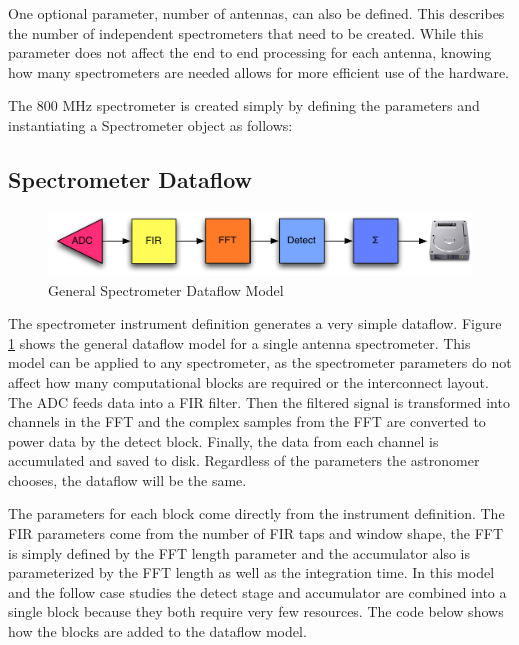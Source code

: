 One optional parameter, number of antennas, can also be defined. 
This describes the number of independent spectrometers that need to be created.
While this parameter does not affect the end to end processing for each antenna, knowing how many spectrometers are needed allows for more efficient use of the hardware.

The 800 MHz spectrometer is created simply by defining the parameters and instantiating a Spectrometer object as follows:



\subsection{Spectrometer Dataflow}

\begin{figure}[ht!]
  \centering
    \includegraphics[width=1\textwidth]{Images/C4/spectrometer_dataflow.pdf}
  \caption{General Spectrometer Dataflow Model}
  \label{fig: C4/spectrometer_dataflow.pdf}
\end{figure}

The spectrometer instrument definition generates a very simple dataflow. 
Figure \ref{fig: C4/spectrometer_dataflow.pdf} shows the general dataflow model for a single antenna spectrometer. 
This model can be applied to any spectrometer, as the spectrometer parameters do not affect how many computational blocks are required or the interconnect layout. 
The ADC feeds data into a FIR filter. 
Then the filtered signal is transformed into channels in the FFT and the complex samples from the FFT are converted to power data by the detect block.
Finally, the data from each channel is accumulated and saved to disk. Regardless of the parameters the astronomer chooses, the dataflow will be the same. 

The parameters for each block come directly from the instrument definition. 
The FIR parameters come from the number of FIR taps and window shape, the FFT is simply defined by the FFT length parameter and the accumulator also is parameterized by the FFT length as well as the integration time. 
In this model and the follow case studies the detect stage and accumulator are combined into a single block because they both require very few resources.
The code below shows how the blocks are added to the dataflow model.

